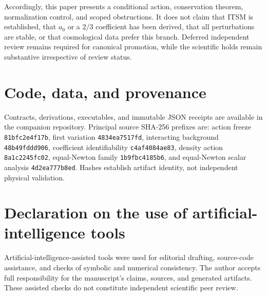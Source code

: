 \documentclass[aps,prd,reprint,superscriptaddress,nofootinbib,floatfix]{revtex4-2}
\begin{document}
Accordingly, this paper presents a conditional action, conservation theorem,
normalization control, and scoped obstructions.  It does not claim that ITSM
is established, that \(a_0\) or a \(2/3\) coefficient has been derived, that
all perturbations are stable, or that cosmological data prefer this branch.
Deferred independent review remains required for canonical promotion, while
the scientific holds remain substantive irrespective of review status.

\section*{Code, data, and provenance}

Contracts, derivations, executables, and immutable JSON receipts are available
in the companion repository.  Principal source SHA-256 prefixes are:
action freeze \texttt{81bfc2e4f17b}, first variation
\texttt{4834ea7517fd}, interacting background \texttt{48b49fddd906},
coefficient identifiability \texttt{c4af4084ae83}, density action
\texttt{8a1c2245fc02}, equal-Newton family \texttt{1b9fbc4185b6}, and
equal-Newton scalar analysis \texttt{4d2ea777b8ed}.  Hashes establish artifact
identity, not independent physical validation.

\section*{Declaration on the use of artificial-intelligence tools}

Artificial-intelligence-assisted tools were used for editorial drafting,
source-code assistance, and checks of symbolic and numerical consistency.
The author accepts full responsibility for the manuscript's claims, sources,
and generated artifacts. These assisted checks do not constitute independent
scientific peer review.



\end{document}
